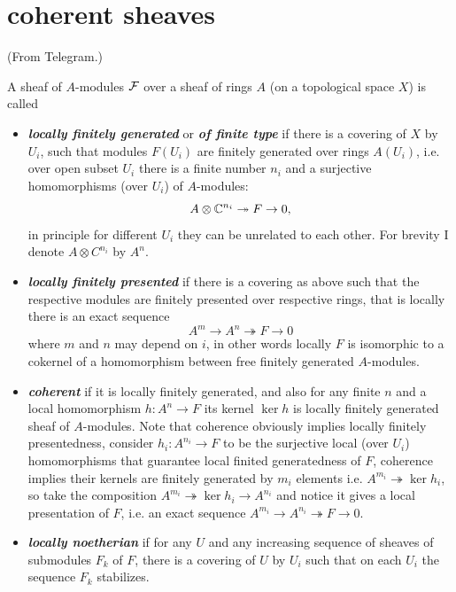 \section{coherent sheaves}

(From Telegram.)

\begin{defn}A sheaf of $A$-modules $\mathcal{F}$ over a sheaf of rings $A$ (on a topological space $X$) is called
	\begin{itemize}
		\item \textbf{\textit{locally finitely generated}} or \textbf{\textit{of finite type}} if there is a covering of $X$ by $U_i$, such that modules $F(U_i)$ are finitely generated over rings $A(U_i)$, i.e. over open subset $U_i$ there is a finite number $n_i$ and a surjective homomorphisms (over $U_i$) of $A$-modules: 
		\[A \otimes \mathbb{C}^{n_i}\twoheadrightarrow F\to 0,\] in principle for different $U_i$ they can be unrelated to each other.   For brevity I denote $A \otimes C^{n_i}$ by $A^n$.
		
		\item \textbf{\textit{locally finitely presented}} if there is a covering as above such that the respective modules are finitely presented over respective rings, that is  locally there is an exact sequence 
		\[A^m\to A^n\twoheadrightarrow F\to 0\]
		where $m$ and $n$ may depend on $i$, in other words locally $F$ is isomorphic to a cokernel of a homomorphism between free finitely generated $A$-modules.
		
		\item \textbf{\textit{coherent}} if it is locally finitely generated, and also for any finite $n$ and a local homomorphism $h : A^n \to F$ its kernel $\ker h$ is locally finitely generated sheaf of $A$-modules. Note that coherence obviously implies locally finitely presentedness,  consider $h_i : A^{n_i} \to F$ to be the surjective local (over $U_i$) homomorphisms that guarantee local finited generatedness of $F$, coherence implies their kernels are finitely generated by $m_i$ elements i.e. $A^{m_i} \twoheadrightarrow \ker h_i$, so take the composition $A^{m_i}\twoheadrightarrow \ker h_i \to A^{n_i}$ and notice it gives a local presentation of $F$, i.e. an exact sequence $A^{m_i} \to A^{n_i}\twoheadrightarrow F\to 0$.

		\item \textbf{\textit{locally noetherian}} if for any $U$ and any increasing sequence of sheaves of submodules $F_k$ of $F$, there is a covering of $U$ by $U_i$ such that on each $U_i$ the sequence $F_k$ stabilizes. 
	\end{itemize}
\end{defn}
